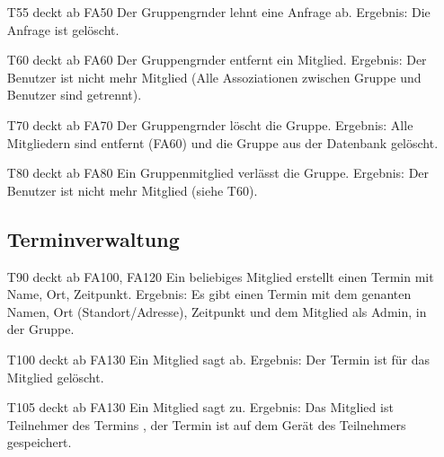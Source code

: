 \documentclass{scrartcl}
\begin{document}
\begin{itemize}
		\item[T55] deckt ab FA50  \newline
		Der \gls{Gruppengrnder} lehnt eine Anfrage ab. \newline
		Ergebnis: Die Anfrage ist gelöscht.

		\item[T60] deckt ab FA60  \newline
		Der \gls{Gruppengrnder} entfernt ein Mitglied.  \newline
		Ergebnis: Der Benutzer ist nicht mehr Mitglied (Alle Assoziationen zwischen Gruppe und Benutzer sind getrennt).

		\item[T70] deckt ab FA70  \newline
		Der \gls{Gruppengrnder} löscht die Gruppe.  \newline
		Ergebnis: Alle Mitgliedern sind entfernt (FA60) und die Gruppe aus der Datenbank gelöscht.

		\item[T80] deckt ab FA80  \newline
		Ein Gruppenmitglied verlässt die Gruppe.  \newline
		Ergebnis: Der Benutzer ist nicht mehr \gls{Mitglied} (siehe T60).

	\subsection{Terminverwaltung}

		\item[T90] deckt ab FA100, FA120  \newline
		Ein beliebiges \gls{Mitglied} erstellt einen Termin mit Name, Ort, Zeitpunkt.  \newline
		Ergebnis: Es gibt einen Termin mit dem genanten Namen, Ort (Standort/Adresse), Zeitpunkt und dem Mitglied als 				Admin, in der Gruppe.
		
		\item [T100] deckt ab FA130  \newline
		Ein \gls{Mitglied} sagt ab.  \newline
		Ergebnis: Der Termin ist für das Mitglied gelöscht.

		\item[T105] deckt ab FA130  \newline
		Ein Mitglied sagt zu.  \newline
		Ergebnis: Das Mitglied ist \gls{Teilnehmer} des Termins , der Termin ist auf dem Gerät des Teilnehmers gespeichert.


\end{itemize}
\end{document}
